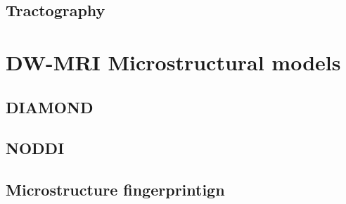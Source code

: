  \subsection{Tractography}
\section{DW-MRI Microstructural models}
 \subsection{DIAMOND}
 \subsection{NODDI}
 \subsection{Microstructure fingerprintign}
